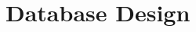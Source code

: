 \documentclass[../DD.tex]{subfiles}
\begin{document}
\chapter{Database Design}
\thispagestyle{fancy}
		
		
		
		
		
\end{document}
